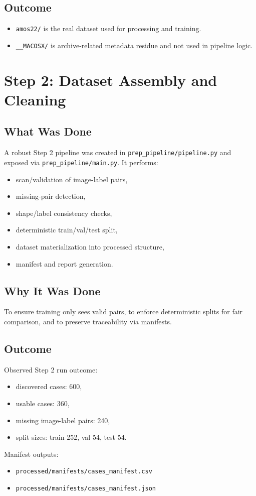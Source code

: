 \documentclass[11pt,a4paper]{article}
\begin{document}
\subsection{Outcome}
\begin{itemize}[leftmargin=1.5em]
  \item \texttt{amos22/} is the real dataset used for processing and training.
  \item \texttt{\_\_MACOSX/} is archive-related metadata residue and not used in pipeline logic.
\end{itemize}

\section{Step 2: Dataset Assembly and Cleaning}
\subsection{What Was Done}
A robust Step 2 pipeline was created in \texttt{prep\_pipeline/pipeline.py} and exposed via \texttt{prep\_pipeline/main.py}. It performs:
\begin{itemize}[leftmargin=1.5em]
  \item scan/validation of image-label pairs,
  \item missing-pair detection,
  \item shape/label consistency checks,
  \item deterministic train/val/test split,
  \item dataset materialization into processed structure,
  \item manifest and report generation.
\end{itemize}

\subsection{Why It Was Done}
To ensure training only sees valid pairs, to enforce deterministic splits for fair comparison, and to preserve traceability via manifests.

\subsection{Outcome}
Observed Step 2 run outcome:
\begin{itemize}[leftmargin=1.5em]
  \item discovered cases: 600,
  \item usable cases: 360,
  \item missing image-label pairs: 240,
  \item split sizes: train 252, val 54, test 54.
\end{itemize}
Manifest outputs:
\begin{itemize}[leftmargin=1.5em]
  \item \texttt{processed/manifests/cases\_manifest.csv}
  \item \texttt{processed/manifests/cases\_manifest.json}
\end{itemize}
\end{document}
